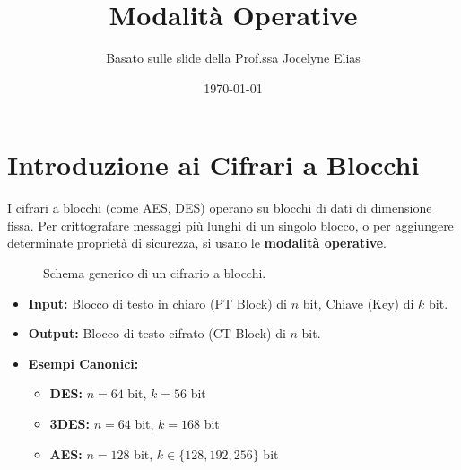 

\title{Modalità Operative}
\author{Basato sulle slide della Prof.ssa Jocelyne Elias}
\date{\today}



\maketitle
\tableofcontents
\newpage

\section{Introduzione ai Cifrari a Blocchi}
I cifrari a blocchi (come AES, DES) operano su blocchi di dati di dimensione fissa. Per crittografare messaggi più lunghi di un singolo blocco, o per aggiungere determinate proprietà di sicurezza, si usano le \textbf{modalità operative}.

\begin{figure}[H]
    \centering
    \caption{Schema generico di un cifrario a blocchi.}
    \label{fig:block_cipher_generic}
\end{figure}

\begin{itemize}
    \item \textbf{Input:} Blocco di testo in chiaro (PT Block) di $n$ bit, Chiave (Key) di $k$ bit.
    \item \textbf{Output:} Blocco di testo cifrato (CT Block) di $n$ bit.
    \item \textbf{Esempi Canonici:}
    \begin{itemize}
        \item \textbf{DES:} $n = 64$ bit, $k = 56$ bit
        \item \textbf{3DES:} $n = 64$ bit, $k = 168$ bit
        \item \textbf{AES:} $n = 128$ bit, $k \in \{128, 192, 256\}$ bit
    \end{itemize}
\end{itemize}

